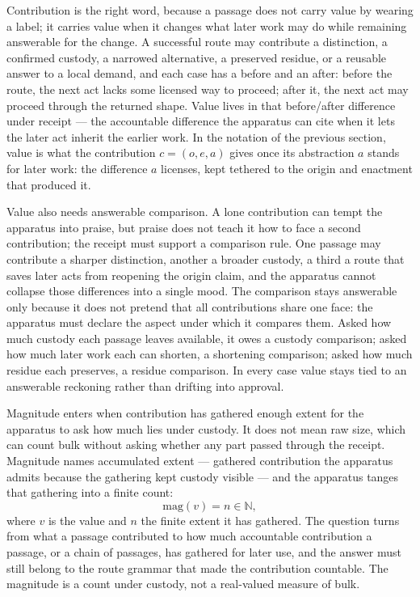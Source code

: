 Contribution is the right word, because a passage does not carry value by wearing a label; it carries value when it changes what later work may do while remaining answerable for the change. A successful route may contribute a distinction, a confirmed custody, a narrowed alternative, a preserved residue, or a reusable answer to a local demand, and each case has a before and an after: before the route, the next act lacks some licensed way to proceed; after it, the next act may proceed through the returned shape. Value lives in that before/after difference under receipt --- the accountable difference the apparatus can cite when it lets the later act inherit the earlier work. In the notation of the previous section, value is what the contribution $c = (o, e, a)$ gives once its abstraction $a$ stands for later work: the difference $a$ licenses, kept tethered to the origin and enactment that produced it.

Value also needs answerable comparison. A lone contribution can tempt the apparatus into praise, but praise does not teach it how to face a second contribution; the receipt must support a comparison rule. One passage may contribute a sharper distinction, another a broader custody, a third a route that saves later acts from reopening the origin claim, and the apparatus cannot collapse those differences into a single mood. The comparison stays answerable only because it does not pretend that all contributions share one face: the apparatus must declare the aspect under which it compares them. Asked how much custody each passage leaves available, it owes a custody comparison; asked how much later work each can shorten, a shortening comparison; asked how much residue each preserves, a residue comparison. In every case value stays tied to an answerable reckoning rather than drifting into approval.

Magnitude enters when contribution has gathered enough extent for the apparatus to ask how much lies under custody. It does not mean raw size, which can count bulk without asking whether any part passed through the receipt. Magnitude names accumulated extent --- gathered contribution the apparatus admits because the gathering kept custody visible --- and the apparatus tanges that gathering into a finite count:
\[ \mathrm{mag}(v) = n \in \mathbb{N}, \]
where $v$ is the value and $n$ the finite extent it has gathered. The question turns from what a passage contributed to how much accountable contribution a passage, or a chain of passages, has gathered for later use, and the answer must still belong to the route grammar that made the contribution countable. The magnitude is a count under custody, not a real-valued measure of bulk.

